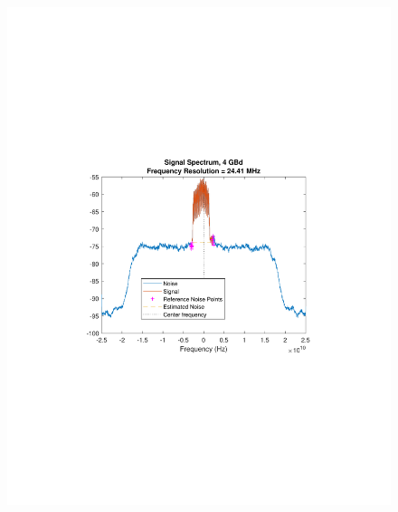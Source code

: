 \begin{refsection}


\begin{figure}[H]
	\centering
	\begin{minipage}{0.43\textwidth}
	\centering
\includegraphics[clip, trim=4cm 8cm 4cm 8cm, width=1\textwidth]{./sdf/m_qam_system/figures/expResults/4GBdSpectrum.pdf}


\end{minipage}
\end{figure}
\end{refsection}
